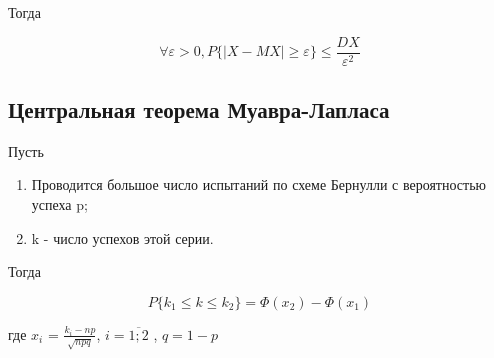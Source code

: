 \documentclass[12pt, a4paper]{report}
\begin{document}
	Тогда
	
	\begin{equation*}
	\forall \varepsilon > 0, P\{ |X - MX| \geq \varepsilon \} \le \frac{DX}{\varepsilon^2}
	\end{equation*}
	
	
	\subsection{Центральная теорема Муавра-Лапласа}
	
	    Пусть
	
	\begin{enumerate}
		\item Проводится большое число испытаний по схеме Бернулли с вероятностью успеха p;
		\item k - число успехов этой серии.
	\end{enumerate}

	Тогда
	
	\begin{equation*}
	P\{ k_1 \le k \le k_2 \} = \Phi(x_2) - \Phi(x_1)
	\end{equation*}
	
	где $x_i$ = $\frac{k_i - np}{\sqrt{npq}}$, $i = \overline{1;2}$ , $q = 1 - p$
	
\end{document}
